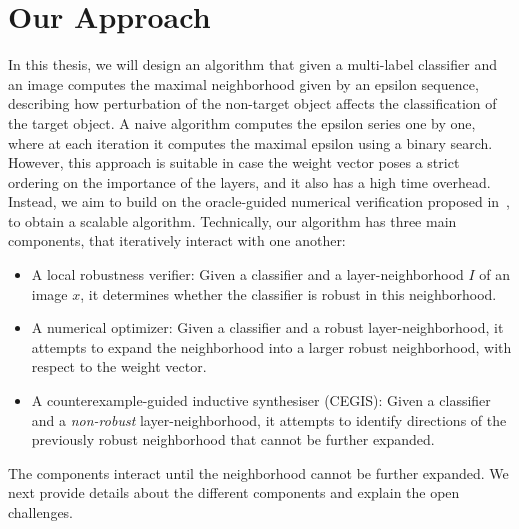 
\section{Our Approach}

In this thesis, we will design an algorithm that given a multi-label classifier and an image computes the maximal neighborhood given by an epsilon sequence, describing how perturbation of the non-target object affects the classification of the target object.
A naive algorithm computes the epsilon series one by one, where at each iteration it computes the maximal epsilon using a binary search.
However, this approach is suitable in case the weight vector poses a strict ordering on the importance of the layers, and it also has a high time overhead.
Instead, we aim to build on the oracle-guided numerical verification proposed in~\cite{MARVEL}, to obtain a scalable algorithm.
Technically, our algorithm has three main components, that iteratively interact with one another:
\begin{itemize}
    \item A local robustness verifier: Given a classifier and a layer-neighborhood $I$ of an image $x$, it determines whether the classifier is robust in this neighborhood.
        \item A numerical optimizer: Given a classifier and a robust layer-neighborhood, it attempts to expand the neighborhood into a larger robust neighborhood, with respect to the weight vector. %
    \item A counterexample-guided inductive synthesiser (CEGIS): Given a classifier and a \emph{non-robust} layer-neighborhood, it attempts to identify directions of the previously robust neighborhood that cannot be further expanded. 
    \end{itemize}
The components interact until the neighborhood cannot be further expanded.
We next provide details about the different components and explain the open challenges.

